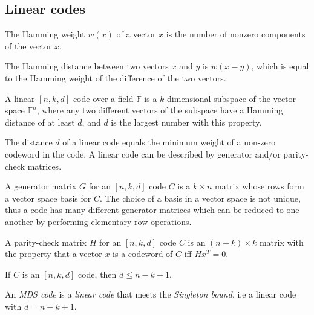 \subsection{Linear codes}
\begin{definition}
The Hamming weight $w(x)$ of a vector $x$ is the number of nonzero components of the vector $x$.
\end{definition}

\begin{definition}
The Hamming distance between two vectors $x$ and $y$ is $w(x - y)$, which is equal to the Hamming weight of the difference of the two vectors.
\end{definition}

\begin{definition}
A linear $[n, k, d]$ code over a field $\mathbb{F}$ is a $k$-dimensional subspace of the vector space $\mathbb{F}^n$, where any two different vectors of the subspace have a Hamming distance of at least $d$, and $d$ is the largest number with this property.

The distance $d$ of a linear code equals the minimum weight of a non-zero codeword in the code. A linear code can be described by generator and/or parity-check matrices.
\end{definition}

\begin{definition}
A generator matrix $G$ for an $[n, k, d]$ code $C$ is a $k \times n$ matrix whose rows form a vector space basis for $C$. The choice of a basis in a vector space is not unique, thus a code has many different generator matrices which can be reduced to one another by performing elementary row operations.
\end{definition}

\begin{definition}
A parity-check matrix $H$ for an $[n, k, d]$ code $C$ is an $(n-k) \times k$ matrix with the property that a vector $x$ is a codeword of $C$ iff $Hx^T = 0$.
\end{definition}

\begin{theorem}
If $C$ is an $[n, k, d]$ code, then $d \leq n - k + 1$.
\end{theorem}

\begin{definition}\label{def:mds-code-singleton}
An \emph{MDS code} is a \emph{linear code} that meets the \emph{Singleton bound}, i.e a linear code with $d = n - k + 1$.
\end{definition}

